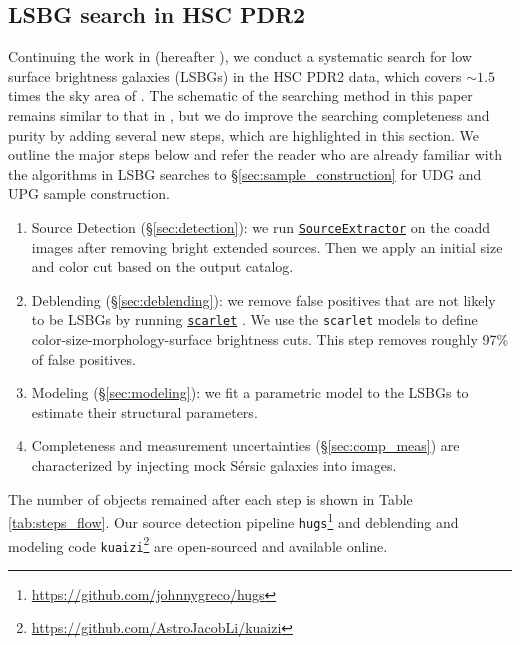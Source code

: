 \documentclass[twocolumn,astrosymb,twocolappendix]{aastex631}
\newcommand{\code}[1]{\texttt{#1}}
\newcommand{\sersic}{S\'ersic}
\begin{document}
\begin{CJK*}{UTF8}{gbsn}
\section{LSBG search in HSC PDR2}\label{sec:lsbg_search}

Continuing the work in \citet{Greco2018} (hereafter ), we conduct a systematic search for low surface brightness galaxies (LSBGs) in the HSC PDR2 data, which covers $\sim 1.5$ times the sky area of . The schematic of the searching method in this paper remains similar to that in , but we do improve the searching completeness and purity by adding several new steps, which are highlighted in this section. We outline the major steps below and refer the reader who are already familiar with the algorithms in LSBG searches to \S \ref{sec:sample_construction} for UDG and UPG sample construction.

\begin{enumerate}
    \item Source Detection (\S \ref{sec:detection}): we run \href{https://www.astromatic.net/software/sextractor/}{\code{SourceExtractor}} \citep{Bertin1996} on the coadd images after removing bright extended sources. Then we apply an initial size and color cut based on the output catalog. 
    \item Deblending (\S \ref{sec:deblending}): we remove false positives that are not likely to be LSBGs by running \href{https://pmelchior.github.io/scarlet/}{\code{scarlet}} \citep{Melchior2018}. We use the \code{scarlet} models to define color-size-morphology-surface brightness cuts. This step removes roughly 97\% of false positives.
    \item Modeling (\S \ref{sec:modeling}): we fit a parametric model to the LSBGs to estimate their structural parameters. 
    \item Completeness and measurement uncertainties (\S \ref{sec:comp_meas}) are characterized by injecting mock \sersic{} galaxies into images. 
\end{enumerate}
The number of objects remained after each step is shown in Table \ref{tab:steps_flow}. Our source detection pipeline \code{hugs}\footnote{\url{https://github.com/johnnygreco/hugs}} and deblending and modeling code \code{kuaizi}\footnote{\url{https://github.com/AstroJacobLi/kuaizi}} are open-sourced and available online.


\end{CJK*}
\end{document}
